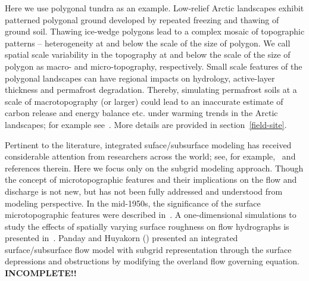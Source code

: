 \documentclass[review,11pt]{elsarticle}
\begin{document}
Here we use polygonal tundra as an example. Low-relief Arctic landscapes exhibit patterned polygonal ground developed by repeated freezing and thawing of ground soil. Thawing ice-wedge polygons lead to a complex mosaic of topographic patterns -- heterogeneity at and below the scale of the size of polygon. We call spatial scale variability in the topography at and below the scale of the size of polygon as macro- and micro-topography, respectively. Small scale features of the polygonal landscapes can have regional impacts on hydrology, active-layer thickness and permafrost degradation. Thereby, simulating permafrost soils at a scale of macrotopography (or larger) could lead to an inaccurate estimate of carbon release and energy balance etc. under warming trends in the Arctic landscapes; for example see~\cite{holden2005peatland,andresen2015disappearing,liljedahl2016pan}. More details are provided in section~\ref{field-site}.




Pertinent to the literature, integrated suface/subsurface modeling has received considerable attention from researchers across the world; see, for example,~\cite{painter2013modeling,kurylyk2014climate,spainter2016integrated} and references therein. Here we focus only on the subgrid modeling approach. Though the concept of microtopographic features and their implications on the flow and discharge is not new, but has not been fully addressed and understood from modeling perspective. 
In the mid-1950s, the significance of the surface microtopographic features were described in~\cite{stammers1956effect}. 
A one-dimensional simulations to study the effects of spatially varying surface roughness on flow hydrographs is presented in~\cite{huang2009influences}.
Panday and Huyakorn (\citeyear{panday2004fully}) presented an integrated surface/subsurface flow model with subgrid representation through the surface depressions and obstructions by modifying the overland flow governing equation. \textbf{INCOMPLETE!!}
\end{document}
